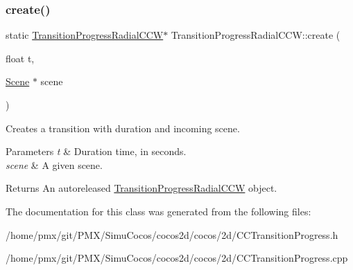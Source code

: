 \subsubsection{\texorpdfstring{create()}{create()}\hspace{0.1cm}{\footnotesize\ttfamily [2/2]}}
{\footnotesize\ttfamily static \hyperlink{classTransitionProgressRadialCCW}{Transition\+Progress\+Radial\+C\+CW}$\ast$ Transition\+Progress\+Radial\+C\+C\+W\+::create (\begin{DoxyParamCaption}\item[{float}]{t,  }\item[{\hyperlink{classScene}{Scene} $\ast$}]{scene }\end{DoxyParamCaption})\hspace{0.3cm}{\ttfamily [static]}}

Creates a transition with duration and incoming scene.


\begin{DoxyParams}{Parameters}
{\em t} & Duration time, in seconds. \\
\hline
{\em scene} & A given scene. \\
\hline
\end{DoxyParams}
\begin{DoxyReturn}{Returns}
An autoreleased \hyperlink{classTransitionProgressRadialCCW}{Transition\+Progress\+Radial\+C\+CW} object. 
\end{DoxyReturn}


The documentation for this class was generated from the following files\+:\begin{DoxyCompactItemize}
\item 
/home/pmx/git/\+P\+M\+X/\+Simu\+Cocos/cocos2d/cocos/2d/C\+C\+Transition\+Progress.\+h\item 
/home/pmx/git/\+P\+M\+X/\+Simu\+Cocos/cocos2d/cocos/2d/C\+C\+Transition\+Progress.\+cpp\end{DoxyCompactItemize}

